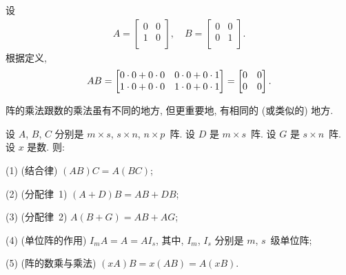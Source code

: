 \documentclass[../libro.tex]{subfiles}
\begin{document}
\begin{example}
    设
    \begin{align*}
        A =
        \begin{bmatrix}
            0 & 0 \\
            1 & 0 \\
        \end{bmatrix},
        \quad
        B =
        \begin{bmatrix}
            0 & 0 \\
            0 & 1 \\
        \end{bmatrix}.
    \end{align*}
    根据定义,
    \begin{equation*}
        AB =
        \begin{bmatrix}
            0 \cdot 0 + 0 \cdot 0 & 0 \cdot 0 + 0 \cdot 1 \\
            1 \cdot 0 + 0 \cdot 0 & 1 \cdot 0 + 0 \cdot 1 \\
        \end{bmatrix}
        =
        \begin{bmatrix}
            0 & 0 \\
            0 & 0 \\
        \end{bmatrix}.
        \qedhere
    \end{equation*}
\end{example}

阵的乘法跟数的乘法虽有不同的地方,
但更重要地, 有相同的 (或类似的) 地方.

\begin{theorem}
    设 \(A\), \(B\), \(C\) 分别是
    \(m \times s\), \(s \times n\), \(n \times p\)~阵.
    设 \(D\) 是 \(m \times s\)~阵.
    设 \(G\) 是 \(s \times n\)~阵.
    设 \(x\) 是数.
    则:

    (1)
    (结合律)
    \((AB)C = A(BC)\);

    (2)
    (分配律~1)
    \((A + D) B = AB + DB\);

    (3)
    (分配律~2)
    \(A (B + G) = AB + AG\);

    (4)
    (单位阵的作用)
    \(I_m A = A = A I_s\),
    其中, \(I_m\), \(I_s\) 分别是 \(m\), \(s\)~级单位阵;

    (5)
    (阵的数乘与乘法)
    \((xA)B = x(AB) = A(xB)\).
\end{theorem}
\end{document}
